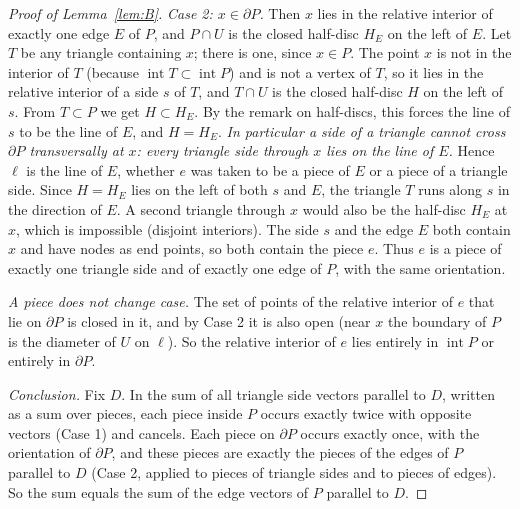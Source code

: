 \documentclass[11pt]{article}
\theoremstyle{definition}
\begin{document}
\begin{proof}[Proof of Lemma~\ref{lem:B}]
\emph{Case 2: $x\in\partial P$.} Then $x$ lies in the relative interior of exactly one edge $E$ of
$P$, and $P\cap U$ is the closed half-disc $H_E$ on the left of $E$. Let $T$ be any triangle
containing $x$; there is one, since $x\in P$. The point $x$ is not in the interior of $T$ (because
$\operatorname{int}T\subset\operatorname{int}P$) and is not a vertex of $T$, so it lies in the
relative interior of a side $s$ of $T$, and $T\cap U$ is the closed half-disc $H$ on the left of
$s$. From $T\subset P$ we get $H\subset H_E$. By the remark on half-discs, this forces the line of
$s$ to be the line of $E$, and $H=H_E$. \emph{In particular a side of a triangle cannot cross
$\partial P$ transversally at $x$: every triangle side through $x$ lies on the line of $E$.} Hence
$\ell$ is the line of $E$, whether $e$ was taken to be a piece of $E$ or a piece of a triangle side.
Since $H=H_E$ lies on the left of both $s$ and $E$, the triangle $T$ runs along $s$ in the direction
of $E$. A second triangle through $x$ would also be the half-disc $H_E$ at $x$, which is impossible
(disjoint interiors). The side $s$ and the edge $E$ both contain $x$ and have nodes as end points, so
both contain the piece $e$. Thus $e$ is a piece of exactly one triangle side and of exactly one
edge of $P$, with the same orientation.

\emph{A piece does not change case.} The set of points of the relative interior of $e$ that lie on
$\partial P$ is closed in it, and by Case 2 it is also open (near $x$ the boundary of $P$ is the
diameter of $U$ on $\ell$). So the relative interior of $e$ lies entirely in $\operatorname{int}P$
or entirely in $\partial P$.

\emph{Conclusion.} Fix $D$. In the sum of all triangle side vectors parallel to $D$, written as a
sum over pieces, each piece inside $P$ occurs exactly twice with opposite vectors (Case 1) and
cancels. Each piece on $\partial P$ occurs exactly once, with the orientation of $\partial P$, and
these pieces are exactly the pieces of the edges of $P$ parallel to $D$ (Case 2, applied to pieces
of triangle sides and to pieces of edges). So the sum equals the sum of the edge vectors of $P$
parallel to $D$.
\end{proof}
\end{document}
